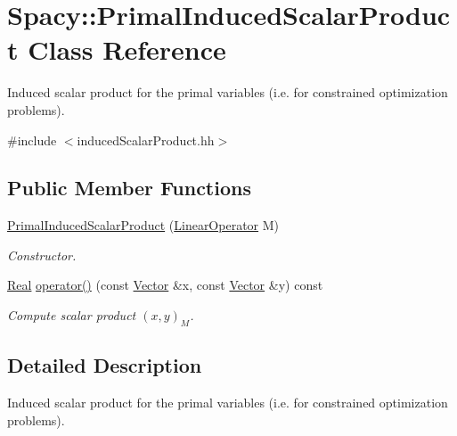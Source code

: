 \hypertarget{classSpacy_1_1PrimalInducedScalarProduct}{\section{\-Spacy\-:\-:\-Primal\-Induced\-Scalar\-Product \-Class \-Reference}
\label{classSpacy_1_1PrimalInducedScalarProduct}
}


\-Induced scalar product for the primal variables (i.\-e. for constrained optimization problems).  




{\ttfamily \#include $<$induced\-Scalar\-Product.\-hh$>$}

\subsection*{\-Public \-Member \-Functions}
\begin{DoxyCompactItemize}
\item 
\hyperlink{classSpacy_1_1PrimalInducedScalarProduct_acfea3362a4d59ae0c689bd525870d830}{\-Primal\-Induced\-Scalar\-Product} (\hyperlink{classSpacy_1_1LinearOperator}{\-Linear\-Operator} \-M)
\begin{DoxyCompactList}\small\item\em \-Constructor. \end{DoxyCompactList}\item 
\hypertarget{classSpacy_1_1PrimalInducedScalarProduct_aee0ed0c7fe70e8630cbf77702d73c97c}{\hyperlink{classSpacy_1_1Real}{\-Real} \hyperlink{classSpacy_1_1PrimalInducedScalarProduct_aee0ed0c7fe70e8630cbf77702d73c97c}{operator()} (const \hyperlink{classSpacy_1_1Vector}{\-Vector} \&x, const \hyperlink{classSpacy_1_1Vector}{\-Vector} \&y) const }\label{classSpacy_1_1PrimalInducedScalarProduct_aee0ed0c7fe70e8630cbf77702d73c97c}

\begin{DoxyCompactList}\small\item\em \-Compute scalar product $(x,y)_M$. \end{DoxyCompactList}\end{DoxyCompactItemize}


\subsection{\-Detailed \-Description}
\-Induced scalar product for the primal variables (i.\-e. for constrained optimization problems). 

